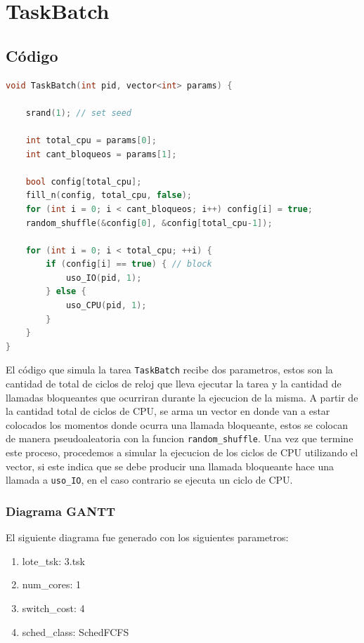 \section{TaskBatch}

\subsection{Código}

\begin{lstlisting}[language=C++, breaklines=true]
void TaskBatch(int pid, vector<int> params) {

	srand(1); // set seed

	int total_cpu = params[0];
	int cant_bloqueos = params[1];

	bool config[total_cpu];
	fill_n(config, total_cpu, false);
	for (int i = 0; i < cant_bloqueos; i++) config[i] = true;
	random_shuffle(&config[0], &config[total_cpu-1]);

	for (int i = 0; i < total_cpu; ++i) {
		if (config[i] == true) { // block
			uso_IO(pid, 1);
		} else {
			uso_CPU(pid, 1);
		}
	}
}
\end{lstlisting}

El código que simula la tarea \texttt{TaskBatch} recibe dos parametros, estos son la cantidad de total de ciclos de reloj que lleva ejecutar la tarea y la cantidad de llamadas bloqueantes que ocurriran durante la ejecucion de la misma. A partir de la cantidad total de ciclos de CPU, se arma un vector en donde van a estar colocados los momentos donde ocurra una llamada bloqueante, estos se colocan de manera pseudoaleatoria con la funcion \texttt{random\_shuffle}. Una vez que termine este proceso, procedemos a simular la ejecucion de los ciclos de CPU utilizando el vector, si este indica que se debe producir una llamada bloqueante hace una llamada a \texttt{uso\_IO}, en el caso contrario se ejecuta un ciclo de CPU.

\subsubsection{Diagrama GANTT}

El siguiente diagrama fue generado con los siguientes parametros:

\begin{enumerate}
	\item lote\_tsk: 3.tsk
	\item num\_cores: 1
	\item switch\_cost: 4
	\item sched\_class: SchedFCFS
\end{enumerate}

